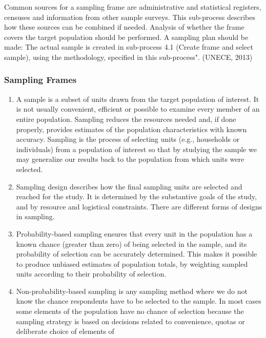 \documentclass[
]{article}
\begin{document}
Common sources for a sampling frame are administrative and statistical
registers, censuses and information from other sample surveys. This
sub-process describes how these sources can be combined if needed.
Analysis of whether the frame covers the target population should be
performed. A sampling plan should be made: The actual sample is created
in sub-process 4.1 (Create frame and select sample), using the
methodology, specified in this sub-process". (UNECE, 2013)

\hypertarget{b.1.-sampling-frames}{%
\subsubsection{Sampling Frames}\label{b.1.-sampling-frames}}

\begin{enumerate}
\def\labelenumi{\arabic{enumi}.}
\setcounter{enumi}{130}
\item
  A sample is a subset of units drawn from the target population of
  interest. It is not usually convenient, efficient or possible to
  examine every member of an entire population. Sampling reduces the
  resources needed and, if done properly, provides estimates of the
  population characteristics with known accuracy. Sampling is the
  process of selecting units (e.g., households or individuals) from a
  population of interest so that by studying the sample we may
  generalize our results back to the population from which units were
  selected.
\item
  Sampling design describes how the final sampling units are selected
  and reached for the study. It is determined by the substantive goals
  of the study, and by resource and logistical constraints. There are
  different forms of designs in sampling.
\item
  Probability-based sampling ensures that every unit in the
  population has a known chance (greater than zero) of being selected
  in the sample, and its probability of selection can be accurately
  determined. This makes it possible to produce unbiased estimates of
  population totals, by weighting sampled units according to their
  probability of selection.
\item
  Non-probability-based sampling is any sampling method where we do
  not know the chance respondents have to be selected to the sample.
  In most cases some elements of the population have no chance of
  selection because the sampling strategy is based on decisions
  related to convenience, quotas or deliberate choice of elements of

\end{enumerate}
\end{document}
